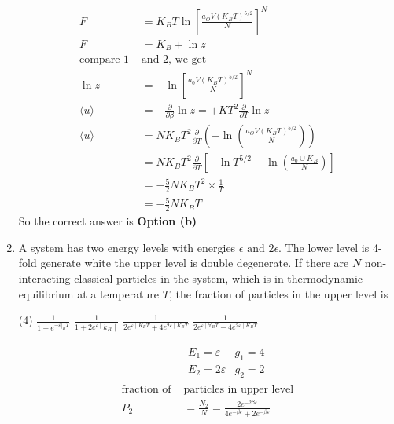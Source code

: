\begin{enumerate}
\begin{answer}
		\begin{align*}
		F&=K_{B} T \ln \left[\frac{a_{O} V\left(K_{B} T\right)^{5 / 2}}{N}\right]^{N}\\
		F&= K_{B}+\ln z\\
		\text{compare 1 }&\text{and 2, we get }\\
		\ln z&=-\ln \left[\frac{a_{0} V\left(K_{B} T\right)^{5 / 2}}{N}\right]^{N} \\
		\langle u\rangle&=-\frac{\partial}{\partial \beta} \ln z=+K T^{2} \frac{\partial}{\partial T} \ln z\\
		\langle u\rangle&=N K_{B} T^{2} \frac{\partial}{\partial T}\left(-\ln \left(\frac{a_{O} V\left(K_{B} T\right)^{5 / 2}}{N}\right)\right)\\
		&=N K_{B} T^{2} \frac{\partial}{\partial T}\left[-\ln T^{5 / 2}-\ln \left(\frac{a_{0} \cup K_{B}}{N}\right)\right]\\
		&=-\frac{5}{2} N K_{B} T^{2} \times \frac{1}{T} \\
		&=-\frac{5}{2} N K_{B} T
		\end{align*}
		So the correct answer is \textbf{Option (b)}
	\end{answer}
	\item A system has two energy levels with energies $\epsilon \text{ and }2\epsilon$. The lower level is 4-fold generate white the upper level is double degenerate. If there are $N$ non-interacting classical particles in the system, which is in thermodynamic equilibrium at a temperature $T$, the fraction of particles in the upper level is 
	\begin{tasks}(4)
		\task[\textbf{a.}] $\frac{1}{1+e^{-\left.\varepsilon\right|_{B} T}}$
		\task[\textbf{b.}] $\frac{1}{1+2 e^{\varepsilon \mid} k_{B} \mid}$
		\task[\textbf{c.}]$\frac{1}{2 e^{\varepsilon \mid K_{B} T}+4 e^{2 \varepsilon \mid K_{B} T}}$
		\task[\textbf{d.}] $\frac{1}{2 e^{\varepsilon \mid \forall_{B} T}-4 e^{2 \varepsilon \mid K_{B} T}}$
	\end{tasks}
	\begin{answer}
		\begin{align*}
		&\begin{array}{ll}
		E_{1}=\varepsilon & g_{1}=4 \\
		E_{2}=2 \varepsilon & g_{2}=2
		\end{array}\\
		\text{fraction of }&\text{particles in upper level}\\
		P_{2}&=\frac{N_{2}}{N}=\frac{2 e^{-2 \beta \varepsilon}}{4 e^{-\beta \varepsilon}+2 e^{-\beta \varepsilon}}\\

\end{align*}
\end{answer}
\end{enumerate}
